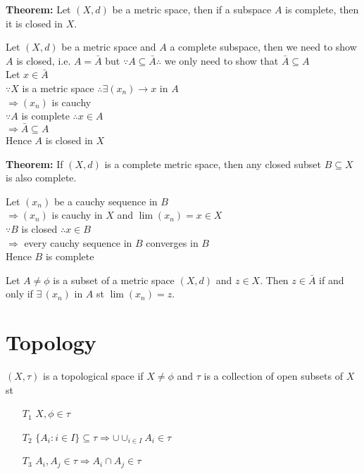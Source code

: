 \documentclass{article}
\begin{document}
\textbf{Theorem:} Let $(X,d)$ be a metric space, then if a subspace $A$ is complete, then it is closed in $X$.
\begin{tcolorbox}[colback=lightgray!10,colframe=lightgray!10, fontupper=\linespread{1.5}\selectfont]
	Let $(X,d)$ be a metric space and $A$ a complete subspace, then we need to show $A$ is closed, i.e. $A = \bar{A}$ but $\because A \subseteq \bar{A} \therefore$ we only need to show that $\bar{A} \subseteq A$ \\
	Let $x \in \bar{A}$ \\
	$\because X$ is a metric space $\therefore \exists (x_n) \rightarrow x$ in $A$ \\
	$ \Rightarrow (x_n)$ is cauchy \\
	$\because A$ is complete $\therefore x \in A$ \\
	$\Rightarrow \bar{A} \subseteq A$ \\
	Hence $A$ is closed in $X$
\end{tcolorbox}

\textbf{Theorem:} If $(X,d)$ is a complete metric space, then any closed subset $B \subseteq X$ is also complete.
\begin{tcolorbox}[colback=lightgray!10,colframe=lightgray!10, fontupper=\linespread{1.5}\selectfont]
	Let $(x_n)$ be a cauchy sequence in $B$ \\
	$\Rightarrow (x_n)$ is cauchy in $X$ and $\lim (x_n) = x \in X$ \\
	$\because B$ is closed $\therefore x \in B$ \\
	$\Rightarrow$ every cauchy sequence in $B$ converges in $B$ \\
	Hence $B$ is complete
\end{tcolorbox}

Let $A \not= \phi$ is a subset of a metric space $(X,d)$ and $z \in X$. Then $z \in \bar{A}$ if and only if $\exists \, (x_n)$ in $A$ st $\lim (x_n) = z$.

\section{Topology}

$(X, \tau)$ is a topological space if $X \not= \phi$ and $\tau$ is a collection of open subsets of $X$ st
\begin{itemize}
	\item[$T_1$] $X, \phi \in \tau$
	\item[$T_2$] $\{A_i: i \in I\} \subseteq \tau \Rightarrow \cup \cup_{i \in I} A_i \in \tau$
	\item[$T_3$] $A_i, A_j \in \tau \Rightarrow A_i \cap A_j \in \tau$
\end{itemize}
\end{document}
